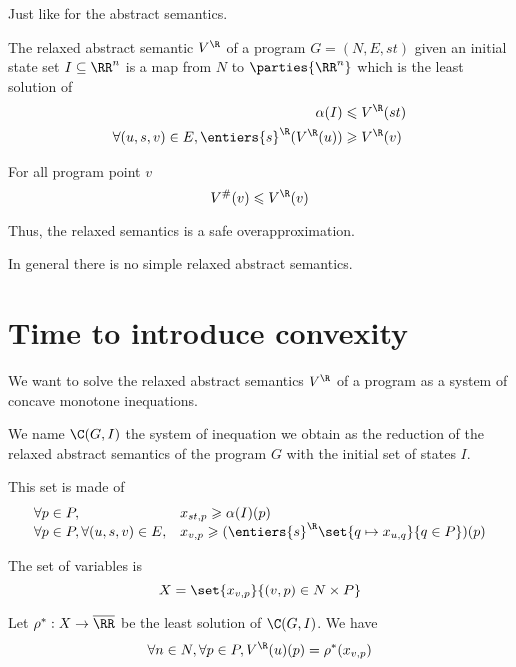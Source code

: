 \documentclass[a4paper, twoside, 10pt]{article}
\begin{document}
Just like for the abstract semantics.

\begin{definition}
The relaxed abstract semantic $V^\R$ of a program $G=(N,E,st)$ given an initial state set $I \subseteq\RR^n$ is a map from $N$ to $\parties{\RR^n}$ which is the least solution of
\[
    \begin{aligned}
        \alpha(I) &\leqslant V^\R(st)\\
        \forall (u,s,v) \in E, \entiers{s}^\R(V^\R(u)) &\geqslant V^\R(v)
    \end{aligned}
\]
\end{definition}

\begin{lemma}
    For all program point $v$
    \[
        V^\#(v) \leqslant V^\R(v)
    \]
\end{lemma}

Thus, the relaxed semantics is a safe overapproximation.

In general there is no simple relaxed abstract semantics.

\section{Time to introduce convexity}

We want to solve the relaxed abstract semantics $V^\R$ of a program as a system of concave monotone inequations.

\begin{notation}
    We name $\C(G, I)$ the system of inequation we obtain as the reduction of the relaxed abstract semantics of the program $G$ with the initial set of states $I$.

    This set is made of
    \[
        \begin{array}{ll}
            \forall p\in P, &x_{st, p} \geqslant \alpha(I)(p) \\
            \forall p \in P, \forall (u,s,v)\in E, &x_{v, p} \geqslant (\entiers{s}^\R\set{q\mapsto x_{u,q}}{q \in P})(p) 
        \end{array}
    \]
\end{notation}

\begin{notation}
    The set of variables is 
    \[
        X = \set{x_{v, p}}{(v,p)\in N\times P}
    \]
\end{notation}

\begin{lemma}
    Let $\rho^*:X\to \overline{\RR}$ be the least solution of $\C(G,I)$. We have
    \[
        \forall n\in N,\forall p\in P, V^\R(u)(p) = \rho^*(x_{v, p})
    \]
\end{lemma}
\end{document}
